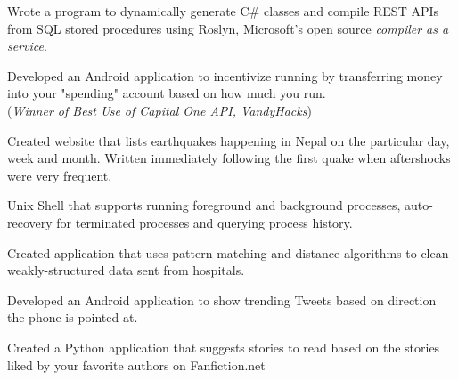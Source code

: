 \documentclass[letterpaper]{deedy-resume} %
\begin{document}
\begin{minipage}[t]{0.66\textwidth}

Wrote a program to dynamically generate C\# classes and compile REST APIs from SQL stored procedures using Roslyn, Microsoft's open source \textit{compiler as a service}.

\sectionspace %


Developed an Android application to incentivize running by transferring money into your "spending" account based on how much you run. \\
(\textit{Winner of Best Use of Capital One API, VandyHacks})

\sectionspace %



Created website that lists  earthquakes happening in Nepal on the particular day, week and month. Written immediately following the first quake when aftershocks were very frequent.

\sectionspace %



Unix Shell that  supports running foreground and background processes, auto-recovery for terminated processes and querying process history.

\sectionspace %


Created application that uses pattern matching and distance algorithms to clean weakly-structured data sent from hospitals. 

\sectionspace %


Developed an Android application to show trending  Tweets based on direction the phone is pointed at.
\sectionspace %


Created a Python application that suggests stories to read based on the stories liked by your favorite authors on Fanfiction.net


\end{minipage}
\end{document}
